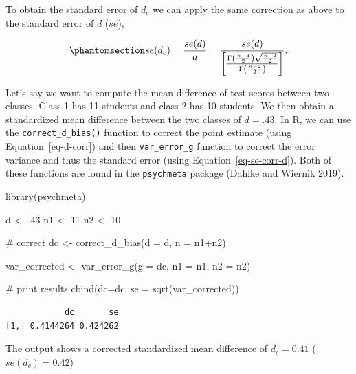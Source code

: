 \documentclass[
  letterpaper,
  DIV=11,
  numbers=noendperiod]{scrreprt}
\newenvironment{Shaded}{}{}
\newcommand{\AttributeTok}[1]{\textcolor[rgb]{0.00,0.34,0.68}{#1}}
\newcommand{\CommentTok}[1]{\textcolor[rgb]{0.54,0.53,0.53}{#1}}
\newcommand{\DecValTok}[1]{\textcolor[rgb]{0.69,0.50,0.00}{#1}}
\newcommand{\FunctionTok}[1]{\textcolor[rgb]{0.39,0.29,0.61}{#1}}
\newcommand{\NormalTok}[1]{\textcolor[rgb]{0.12,0.11,0.11}{#1}}
\newcommand{\OtherTok}[1]{\textcolor[rgb]{0.00,0.43,0.16}{#1}}
\newcommand{\SpecialCharTok}[1]{\textcolor[rgb]{0.24,0.68,0.91}{#1}}
\begin{document}
To obtain the standard error of \(d_c\) we can apply the same correction
as above to the standard error of \(d\) (\(se\)),

\begin{equation}\phantomsection\label{eq-se-corr-d}{
se(d_c) = \frac{se(d)}{a} = \frac{se(d)}{ \left[\frac{\Gamma\left(\frac{n-3}{2}\right)\sqrt{\frac{n-2}{2}}}{\Gamma\left(\frac{n-2}{2}\right)}\right]}.
}\end{equation}

\begin{tcolorbox}[enhanced jigsaw, opacityback=0, coltitle=black, toprule=.15mm, colframe=quarto-callout-note-color-frame, bottomtitle=1mm, rightrule=.15mm, colbacktitle=quarto-callout-note-color!10!white, left=2mm, bottomrule=.15mm, breakable, title={Applied Example in R}, colback=white, opacitybacktitle=0.6, titlerule=0mm, arc=.35mm, leftrule=.75mm, toptitle=1mm]

Let's say we want to compute the mean difference of test scores between
two classes. Class 1 has 11 students and class 2 has 10 students. We
then obtain a standardized mean difference between the two classes of
\(d=.43\). In R, we can use the \texttt{correct\_d\_bias()} function to
correct the point estimate (using Equation~\ref{eq-d-corr}) and then
\texttt{var\_error\_g} function to correct the error variance and thus
the standard error (using Equation~\ref{eq-se-corr-d}). Both of these
functions are found in the \texttt{psychmeta} package (Dahlke and
Wiernik 2019).

\begin{Shaded}
\begin{Highlighting}[]
\FunctionTok{library}\NormalTok{(psychmeta)}

\NormalTok{d }\OtherTok{\textless{}{-}}\NormalTok{ .}\DecValTok{43}
\NormalTok{n1 }\OtherTok{\textless{}{-}} \DecValTok{11}
\NormalTok{n2 }\OtherTok{\textless{}{-}} \DecValTok{10}

\CommentTok{\# correct}
\NormalTok{dc }\OtherTok{\textless{}{-}} \FunctionTok{correct\_d\_bias}\NormalTok{(}\AttributeTok{d =}\NormalTok{ d,}
                     \AttributeTok{n =}\NormalTok{ n1}\SpecialCharTok{+}\NormalTok{n2)}

\NormalTok{var\_corrected }\OtherTok{\textless{}{-}} \FunctionTok{var\_error\_g}\NormalTok{(}\AttributeTok{g =}\NormalTok{ dc, }
                             \AttributeTok{n1 =}\NormalTok{ n1, }
                             \AttributeTok{n2 =}\NormalTok{ n2)}

\CommentTok{\# print results}
\FunctionTok{cbind}\NormalTok{(}\AttributeTok{dc=}\NormalTok{dc, }\AttributeTok{se =} \FunctionTok{sqrt}\NormalTok{(var\_corrected))}
\end{Highlighting}
\end{Shaded}

\begin{verbatim}
            dc       se
[1,] 0.4144264 0.424262
\end{verbatim}

The output shows a corrected standardized mean difference of
\(d_c = 0.41\) (\(se(d_c) = 0.42\))

\end{tcolorbox}
\end{document}
